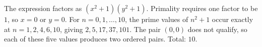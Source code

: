 The expression factors as $(x^2+1)(y^2+1)$. Primality requires one factor to be $1$, so $x=0$ or $y=0$. For $n=0,1,\ldots,10$, the prime values of $n^2+1$ occur exactly at $n=1,2,4,6,10$, giving $2,5,17,37,101$. The pair $(0,0)$ does not qualify, so each of these five values produces two ordered pairs. Total: $\boxed{10}$.
